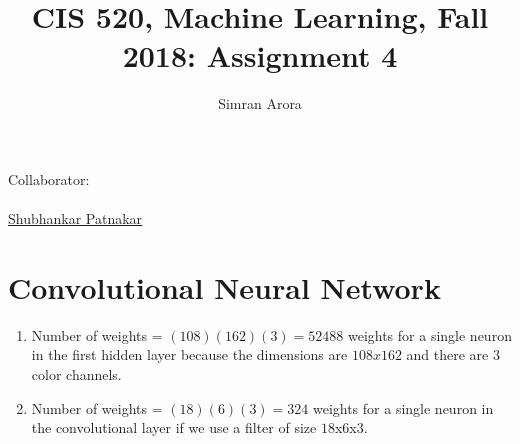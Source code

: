 \documentclass[english]{article}
\title{CIS 520, Machine Learning, Fall 2018: Assignment 4\\}
\date{}
\author{Simran Arora}
\begin{document}
\maketitle
{\normalsize Collaborator:\\
\\ \underline{Shubhankar Patnakar}}


\section{Convolutional Neural Network}
\begin{enumerate}
    \item Number of weights  = $(108)(162)(3) = 52488$ weights for a single neuron in the first hidden layer because the dimensions are $108x162$ and there are $3$ color channels. 
    
    \item Number of weights = $(18)(6)(3) = 324$ weights for a single neuron in the convolutional layer if we use a filter of size $18$x$6$x$3$.
    

\end{enumerate}
\end{document}
